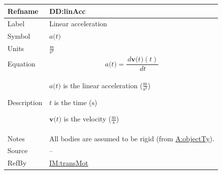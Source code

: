 \documentclass[12pt]{article}
\begin{document}
\vspace{\baselineskip}
\noindent
\begin{minipage}{\textwidth}
\begin{tabular}{>{\raggedright}p{}>{\raggedright\arraybackslash}p{}}
\toprule \textbf{Refname} & \textbf{DD:linAcc}
\label{DD:linAcc}
\\ \midrule
Label & Linear acceleration
        
\\ \midrule
Symbol & $a\text{(}t\text{)}$
         
\\ \midrule
Units & $\frac{\text{m}}{\text{s}^{2}}$
        
\\ \midrule
Equation & \begin{displaymath}
           a\text{(}t\text{)}=\frac{\,d\symbf{v}\text{(}t\text{)}\left(t\right)}{\,dt}
           \end{displaymath}
\\ \midrule
Description & \begin{symbDescription}
              \item{$a\text{(}t\text{)}$ is the linear acceleration ($\frac{\text{m}}{\text{s}^{2}}$)}
              \item{$t$ is the time (${\text{s}}$)}
              \item{$\symbf{v}\text{(}t\text{)}$ is the velocity ($\frac{\text{m}}{\text{s}}$)}
              \end{symbDescription}
\\ \midrule
Notes & All bodies are assumed to be rigid (from \hyperref[assumpOT]{A:objectTy}).
        
\\ \midrule
Source & --
         
\\ \midrule
RefBy & \hyperref[IM:transMot]{IM:transMot}
        
\\ \bottomrule
\end{tabular}
\end{minipage}
\end{document}
